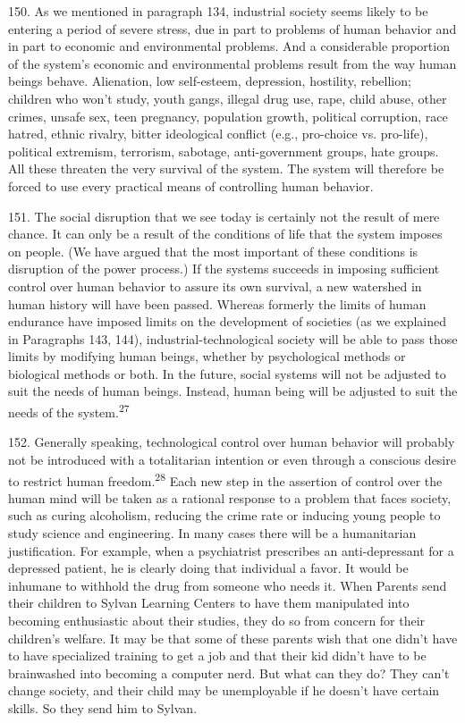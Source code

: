 \documentclass{article}
\begin{document}
150. As we mentioned in paragraph 134, industrial society seems likely to be entering a period of 
severe stress, due in part to problems of human behavior and in part to economic and 
environmental problems. And a considerable proportion of the system’s economic and 
environmental problems result from the way human beings behave. Alienation, low self-esteem, 
depression, hostility, rebellion; children who won’t study, youth gangs, illegal drug use, rape, child 
abuse, other crimes, unsafe sex, teen pregnancy, population growth, political corruption, race 
hatred, ethnic rivalry, bitter ideological conflict (e.g., pro-choice vs. pro-life), political extremism, 
terrorism, sabotage, anti-government groups, hate groups. All these threaten the very survival of 
the system. The system will therefore be forced to use every practical means of controlling human 
behavior. \vspace{\baselineskip}

151. The social disruption that we see today is certainly not the result of mere chance. It can only 
be a result of the conditions of life that the system imposes on people. (We have argued that the 
most important of these conditions is disruption of the power process.) If the systems succeeds in 
imposing sufficient control over human behavior to assure its own survival, a new watershed in 
human history will have been passed. Whereas formerly the limits of human endurance have 
imposed limits on the development of societies (as we explained in Paragraphs 143, 144), 
industrial-technological society will be able to pass those limits by modifying human beings, 
whether by psychological methods or biological methods or both. In the future, social systems 
will not be adjusted to suit the needs of human beings. Instead, human being will be adjusted to 
suit the needs of the system.\textsuperscript{27} \vspace{\baselineskip}

152. Generally speaking, technological control over human behavior will probably not be 
introduced with a totalitarian intention or even through a conscious desire to restrict human 
freedom.\textsuperscript{28} Each new step in the assertion of control over the human mind will be taken as a rational 
response to a problem that faces society, such as curing alcoholism, reducing the crime rate or 
inducing young people to study science and engineering. In many cases there will be a 
humanitarian justification. For example, when a psychiatrist prescribes an anti-depressant for a 
depressed patient, he is clearly doing that individual a favor. It would be inhumane to withhold 
the drug from someone who needs it. When Parents send their children to Sylvan Learning Centers 
to have them manipulated into becoming enthusiastic about their studies, they do so from concern 
for their children’s welfare. It may be that some of these parents wish that one didn’t have to have 
specialized training to get a job and that their kid didn’t have to be brainwashed into becoming a 
computer nerd. But what can they do? They can’t change society, and their child may be 
unemployable if he doesn’t have certain skills. So they send him to Sylvan. \vspace{\baselineskip}
 
\end{document}
